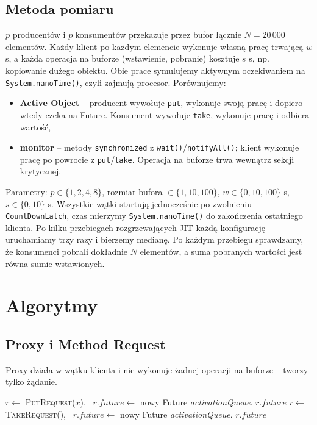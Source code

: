 \documentclass[11pt,a4paper]{article}
\newenvironment{algorytm}[1][htb]
  {\par\bigskip\floatname{algorithm}{}\renewcommand{\thealgorithm}{}
   \begin{algorithm}[#1]%
  }{\end{algorithm}\par\bigskip}
\begin{document}
\subsection{Metoda pomiaru}
$p$ producentów i $p$ konsumentów przekazuje przez bufor łącznie $N = 20\,000$ elementów.
Każdy klient po każdym elemencie wykonuje własną pracę trwającą $w$ \textmu s, a każda operacja
na buforze (wstawienie, pobranie) kosztuje $s$ \textmu s, np. kopiowanie dużego obiektu.
Obie prace symulujemy aktywnym oczekiwaniem na \texttt{System.nanoTime()}, czyli zajmują procesor.
Porównujemy:
\begin{itemize}
    \item \textbf{Active Object} -- producent wywołuje \texttt{put}, wykonuje swoją pracę i dopiero
          wtedy czeka na Future. Konsument wywołuje \texttt{take}, wykonuje pracę i odbiera wartość,
    \item \textbf{monitor} -- metody \texttt{synchronized} z \texttt{wait()}/\texttt{notifyAll()};
          klient wykonuje pracę po powrocie z \texttt{put}/\texttt{take}. Operacja na buforze trwa
          wewnątrz sekcji krytycznej.
\end{itemize}
Parametry: $p \in \{1, 2, 4, 8\}$, rozmiar bufora $\in \{1, 10, 100\}$, $w \in \{0, 10, 100\}$ \textmu s,
$s \in \{0, 10\}$ \textmu s. Wszystkie wątki startują jednocześnie po zwolnieniu \texttt{CountDownLatch},
czas mierzymy \texttt{System.nanoTime()} do zakończenia ostatniego klienta. Po kilku przebiegach
rozgrzewających JIT każdą konfigurację uruchamiamy trzy razy i bierzemy medianę.
Po każdym przebiegu sprawdzamy, że konsumenci pobrali dokładnie $N$ elementów, a suma pobranych
wartości jest równa sumie wstawionych.

\section{Algorytmy}
\subsection{Proxy i Method Request}
Proxy działa w wątku klienta i nie wykonuje żadnej operacji na buforze -- tworzy tylko żądanie.

\begin{algorytm}[H]
\begin{algorithmic}[1]
     
        \State $r \gets$ \textsc{PutRequest}($x$), \ $r.\textit{future} \gets$ nowy Future
        \State \textit{activationQueue}.
        \State \Return $r.\textit{future}$
    \EndProcedure
     
        \State $r \gets$ \textsc{TakeRequest}(), \ $r.\textit{future} \gets$ nowy Future
        \State \textit{activationQueue}.
        \State \Return $r.\textit{future}$
    \EndProcedure
\end{algorithmic}
\caption{Proxy}
\end{algorytm}
\end{document}
